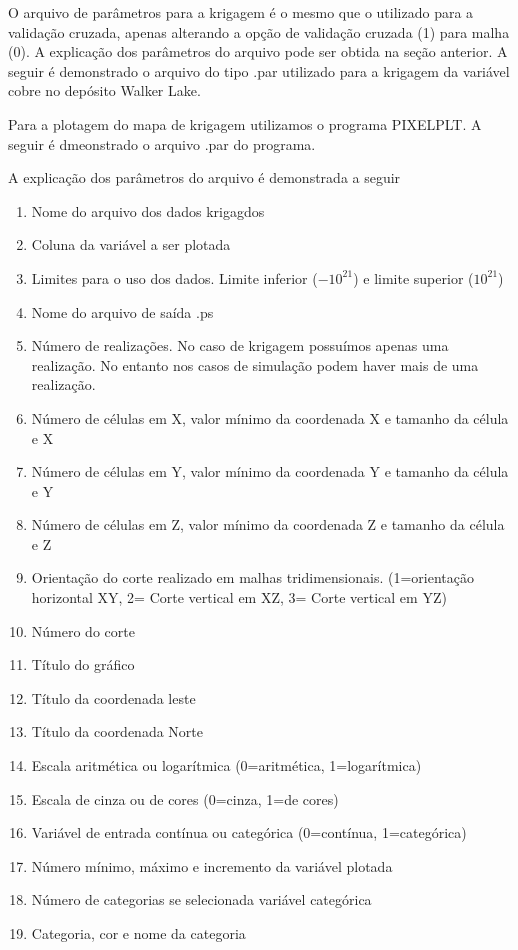 O arquivo de parâmetros para a krigagem é o mesmo que o utilizado para a validação cruzada, apenas alterando a opção de validação cruzada (1) para malha (0). A explicação dos parâmetros do arquivo pode ser obtida na seção anterior. A seguir é demonstrado o arquivo do tipo .par utilizado para a krigagem da variável cobre no depósito Walker Lake.  

\begin{small}
	\begingroup
	
	\endgroup
\end{small}

Para a plotagem do mapa de krigagem utilizamos o programa PIXELPLT. A seguir é dmeonstrado o arquivo .par do programa.

\begin{small}
	\begingroup
	
	\endgroup
\end{small} 

A explicação dos parâmetros do arquivo é demonstrada a seguir

\begin{enumerate}
	\item Nome do arquivo dos dados krigagdos 
	\item Coluna da variável a ser plotada 
	\item Limites para o uso dos dados. Limite inferior ($-10 ^{21}$) e limite superior ($10 ^{21} $)
	\item Nome do arquivo de saída .ps 
	\item Número de realizações. No caso de krigagem possuímos apenas uma realização. No entanto nos casos de simulação podem haver mais de uma realização.
	\item Número de células em X, valor mínimo da coordenada X e tamanho da célula e X
	\item Número de células em Y, valor mínimo da coordenada Y e tamanho da célula e Y  
	\item Número de células em Z, valor mínimo da coordenada Z e tamanho da célula e Z
	\item Orientação do corte realizado em malhas tridimensionais. (1=orientação horizontal XY, 2= Corte vertical em XZ, 3= Corte vertical em YZ)
	\item Número do corte 
	\item Título do gráfico
	\item Título da coordenada leste 
	\item Título da coordenada Norte 
	\item Escala aritmética ou logarítmica (0=aritmética, 1=logarítmica)
	\item Escala de cinza ou de cores (0=cinza, 1=de cores)
	\item Variável de entrada contínua ou categórica (0=contínua, 1=categórica)
	\item Número mínimo, máximo e incremento da variável plotada
	\item Número de categorias se selecionada variável categórica
	\item Categoria, cor e nome da categoria
\end{enumerate}

